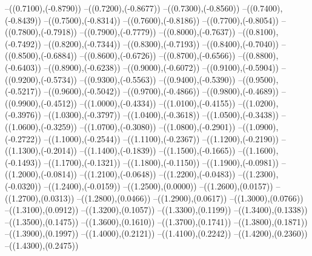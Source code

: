 {	--({\sx*(0.7100)},{\sy*(-0.8790)})
	--({\sx*(0.7200)},{\sy*(-0.8677)})
	--({\sx*(0.7300)},{\sy*(-0.8560)})
	--({\sx*(0.7400)},{\sy*(-0.8439)})
	--({\sx*(0.7500)},{\sy*(-0.8314)})
	--({\sx*(0.7600)},{\sy*(-0.8186)})
	--({\sx*(0.7700)},{\sy*(-0.8054)})
	--({\sx*(0.7800)},{\sy*(-0.7918)})
	--({\sx*(0.7900)},{\sy*(-0.7779)})
	--({\sx*(0.8000)},{\sy*(-0.7637)})
	--({\sx*(0.8100)},{\sy*(-0.7492)})
	--({\sx*(0.8200)},{\sy*(-0.7344)})
	--({\sx*(0.8300)},{\sy*(-0.7193)})
	--({\sx*(0.8400)},{\sy*(-0.7040)})
	--({\sx*(0.8500)},{\sy*(-0.6884)})
	--({\sx*(0.8600)},{\sy*(-0.6726)})
	--({\sx*(0.8700)},{\sy*(-0.6566)})
	--({\sx*(0.8800)},{\sy*(-0.6403)})
	--({\sx*(0.8900)},{\sy*(-0.6238)})
	--({\sx*(0.9000)},{\sy*(-0.6072)})
	--({\sx*(0.9100)},{\sy*(-0.5904)})
	--({\sx*(0.9200)},{\sy*(-0.5734)})
	--({\sx*(0.9300)},{\sy*(-0.5563)})
	--({\sx*(0.9400)},{\sy*(-0.5390)})
	--({\sx*(0.9500)},{\sy*(-0.5217)})
	--({\sx*(0.9600)},{\sy*(-0.5042)})
	--({\sx*(0.9700)},{\sy*(-0.4866)})
	--({\sx*(0.9800)},{\sy*(-0.4689)})
	--({\sx*(0.9900)},{\sy*(-0.4512)})
	--({\sx*(1.0000)},{\sy*(-0.4334)})
	--({\sx*(1.0100)},{\sy*(-0.4155)})
	--({\sx*(1.0200)},{\sy*(-0.3976)})
	--({\sx*(1.0300)},{\sy*(-0.3797)})
	--({\sx*(1.0400)},{\sy*(-0.3618)})
	--({\sx*(1.0500)},{\sy*(-0.3438)})
	--({\sx*(1.0600)},{\sy*(-0.3259)})
	--({\sx*(1.0700)},{\sy*(-0.3080)})
	--({\sx*(1.0800)},{\sy*(-0.2901)})
	--({\sx*(1.0900)},{\sy*(-0.2722)})
	--({\sx*(1.1000)},{\sy*(-0.2544)})
	--({\sx*(1.1100)},{\sy*(-0.2367)})
	--({\sx*(1.1200)},{\sy*(-0.2190)})
	--({\sx*(1.1300)},{\sy*(-0.2014)})
	--({\sx*(1.1400)},{\sy*(-0.1839)})
	--({\sx*(1.1500)},{\sy*(-0.1665)})
	--({\sx*(1.1600)},{\sy*(-0.1493)})
	--({\sx*(1.1700)},{\sy*(-0.1321)})
	--({\sx*(1.1800)},{\sy*(-0.1150)})
	--({\sx*(1.1900)},{\sy*(-0.0981)})
	--({\sx*(1.2000)},{\sy*(-0.0814)})
	--({\sx*(1.2100)},{\sy*(-0.0648)})
	--({\sx*(1.2200)},{\sy*(-0.0483)})
	--({\sx*(1.2300)},{\sy*(-0.0320)})
	--({\sx*(1.2400)},{\sy*(-0.0159)})
	--({\sx*(1.2500)},{\sy*(0.0000)})
	--({\sx*(1.2600)},{\sy*(0.0157)})
	--({\sx*(1.2700)},{\sy*(0.0313)})
	--({\sx*(1.2800)},{\sy*(0.0466)})
	--({\sx*(1.2900)},{\sy*(0.0617)})
	--({\sx*(1.3000)},{\sy*(0.0766)})
	--({\sx*(1.3100)},{\sy*(0.0912)})
	--({\sx*(1.3200)},{\sy*(0.1057)})
	--({\sx*(1.3300)},{\sy*(0.1199)})
	--({\sx*(1.3400)},{\sy*(0.1338)})
	--({\sx*(1.3500)},{\sy*(0.1475)})
	--({\sx*(1.3600)},{\sy*(0.1610)})
	--({\sx*(1.3700)},{\sy*(0.1741)})
	--({\sx*(1.3800)},{\sy*(0.1871)})
	--({\sx*(1.3900)},{\sy*(0.1997)})
	--({\sx*(1.4000)},{\sy*(0.2121)})
	--({\sx*(1.4100)},{\sy*(0.2242)})
	--({\sx*(1.4200)},{\sy*(0.2360)})
	--({\sx*(1.4300)},{\sy*(0.2475)})
}
